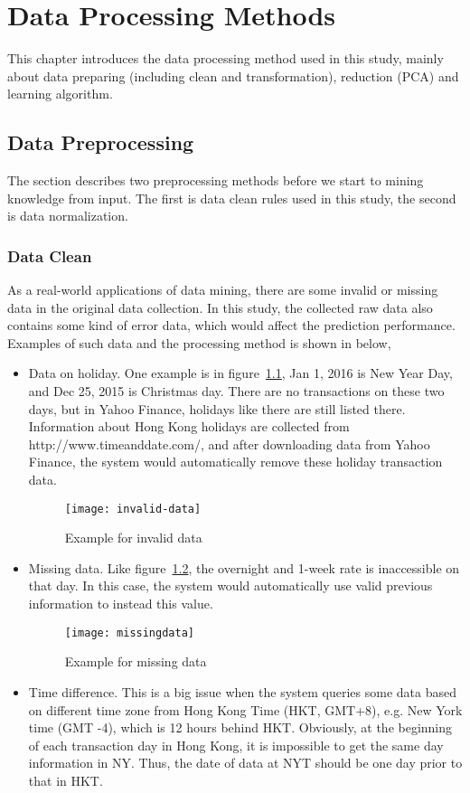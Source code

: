 \chapter{Data Processing Methods}
\label{ch:mining}

This chapter introduces the data processing method used in this study, mainly about data preparing (including clean and transformation), reduction (PCA) and learning algorithm.

\section{Data Preprocessing}

The section describes two preprocessing methods before we start to mining knowledge from input. The first is data clean rules used in this study, the second is data normalization.

\subsection{Data Clean}
As a real-world applications of data mining, there are some invalid or missing data in the original data collection. In this study, the collected raw data also contains some kind of error data, which would affect the prediction performance. Examples of such data and the processing method is shown in below,

\begin{itemize}
	\item Data on holiday. One example is in figure~\ref{fg:invalid_data}, Jan 1, 2016 is New Year Day, and Dec 25, 2015 is Christmas day. There are no transactions on these two days, but in Yahoo Finance, holidays like there are still listed there. Information about Hong Kong holidays are collected from http://www.timeanddate.com/, and after downloading data from Yahoo Finance, the system would automatically remove these holiday transaction data.
	\begin{figure}[h]
		\centering
		\texttt{[image: invalid-data]}
		\caption{Example for invalid data}
		\label{fg:invalid_data}
	\end{figure}
	\item Missing data. Like figure~\ref{fg:missing_data}, the overnight and 1-week rate is inaccessible on that day. In this case, the system would automatically use valid previous information to instead this value.
	\begin{figure}[h]
		\centering
		\texttt{[image: missingdata]}
		\caption{Example for missing data}
		\label{fg:missing_data}
	\end{figure}
	\item Time difference. This is a big issue when the system queries some data based on different time zone from Hong Kong Time (HKT, GMT+8), e.g. New York time (GMT -4), which is 12 hours behind HKT. Obviously, at the beginning of each transaction day in Hong Kong, it is impossible to get the same day information in NY. Thus, the date of data at NYT should be one day prior to that in HKT.
\end{itemize}


